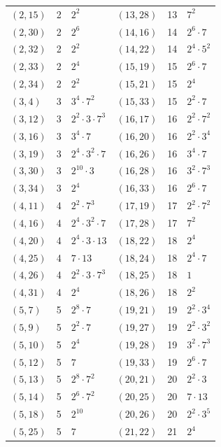 \documentclass[11pt]{article}
\begin{document}
\begin{longtable}{@{}lrl@{\qquad}lrl@{}}
$(2,15)$ & 2 & $2^{2}$ & $(13,28)$ & 13 & $7^{2}$\\
$(2,30)$ & 2 & $2^{6}$ & $(14,16)$ & 14 & $2^{6}\cdot 7$\\
$(2,32)$ & 2 & $2^{2}$ & $(14,22)$ & 14 & $2^{4}\cdot 5^{2}$\\
$(2,33)$ & 2 & $2^{4}$ & $(15,19)$ & 15 & $2^{6}\cdot 7$\\
$(2,34)$ & 2 & $2^{2}$ & $(15,21)$ & 15 & $2^{4}$\\
$(3,4)$ & 3 & $3^{4}\cdot 7^{2}$ & $(15,33)$ & 15 & $2^{2}\cdot 7$\\
$(3,12)$ & 3 & $2^{2}\cdot 3\cdot 7^{3}$ & $(16,17)$ & 16 & $2^{2}\cdot 7^{2}$\\
$(3,16)$ & 3 & $3^{4}\cdot 7$ & $(16,20)$ & 16 & $2^{2}\cdot 3^{4}$\\
$(3,19)$ & 3 & $2^{4}\cdot 3^{2}\cdot 7$ & $(16,26)$ & 16 & $3^{4}\cdot 7$\\
$(3,30)$ & 3 & $2^{10}\cdot 3$ & $(16,28)$ & 16 & $3^{2}\cdot 7^{3}$\\
$(3,34)$ & 3 & $2^{4}$ & $(16,33)$ & 16 & $2^{6}\cdot 7$\\
$(4,11)$ & 4 & $2^{2}\cdot 7^{3}$ & $(17,19)$ & 17 & $2^{2}\cdot 7^{2}$\\
$(4,16)$ & 4 & $2^{4}\cdot 3^{2}\cdot 7$ & $(17,28)$ & 17 & $7^{2}$\\
$(4,20)$ & 4 & $2^{4}\cdot 3\cdot 13$ & $(18,22)$ & 18 & $2^{4}$\\
$(4,25)$ & 4 & $7\cdot 13$ & $(18,24)$ & 18 & $2^{4}\cdot 7$\\
$(4,26)$ & 4 & $2^{2}\cdot 3\cdot 7^{3}$ & $(18,25)$ & 18 & $1$\\
$(4,31)$ & 4 & $2^{4}$ & $(18,26)$ & 18 & $2^{2}$\\
$(5,7)$ & 5 & $2^{8}\cdot 7$ & $(19,21)$ & 19 & $2^{2}\cdot 3^{4}$\\
$(5,9)$ & 5 & $2^{2}\cdot 7$ & $(19,27)$ & 19 & $2^{2}\cdot 3^{2}$\\
$(5,10)$ & 5 & $2^{4}$ & $(19,28)$ & 19 & $3^{2}\cdot 7^{3}$\\
$(5,12)$ & 5 & $7$ & $(19,33)$ & 19 & $2^{6}\cdot 7$\\
$(5,13)$ & 5 & $2^{8}\cdot 7^{2}$ & $(20,21)$ & 20 & $2^{2}\cdot 3$\\
$(5,14)$ & 5 & $2^{6}\cdot 7^{2}$ & $(20,25)$ & 20 & $7\cdot 13$\\
$(5,18)$ & 5 & $2^{10}$ & $(20,26)$ & 20 & $2^{2}\cdot 3^{5}$\\
$(5,25)$ & 5 & $7$ & $(21,22)$ & 21 & $2^{4}$\\

\end{longtable}
\end{document}
